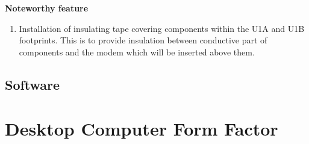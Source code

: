 \textbf{Noteworthy feature}
\begin{enumerate}
\item Installation of insulating tape covering components within the U1A and U1B footprints. This is to provide insulation between conductive part of components and the modem which will be inserted above them. \\
\end{enumerate}


\subsection{Software}



\section{Desktop Computer Form Factor}
